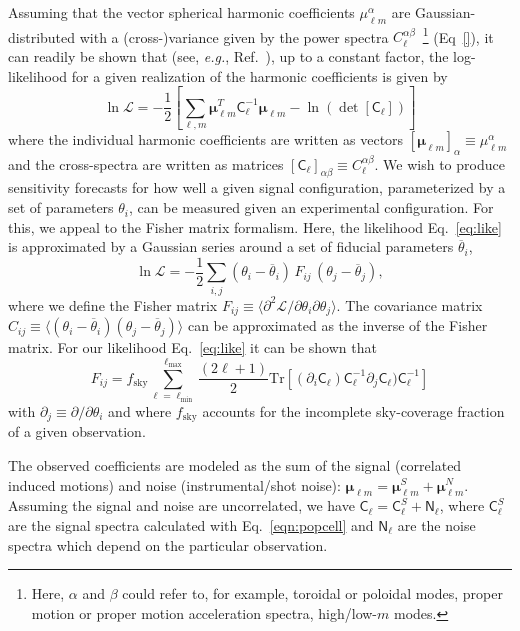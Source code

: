 \documentclass[twocolumn]{aastex63}
\newcommand{\vect}[1]{\boldsymbol{\mathbf{#1}}}
\newcommand{\ellm}{{\ell m}}
\begin{document}
Assuming that the vector spherical harmonic coefficients $\mu_\ellm^{\alpha}$ are Gaussian-distributed with a (cross-)variance given by the power spectra $C_\ell^{\alpha\beta}$~\footnote{Here, $\alpha$ and $\beta$ could refer to, for example, toroidal or poloidal modes, proper motion or proper motion acceleration spectra, high/low-$m$ modes.} (Eq~\ref{}), it can readily be shown that (see, \emph{e.g.}, Ref.~\cite{}), up to a constant factor,  the log-likelihood for a given realization of the harmonic coefficients is given by 
\begin{equation}
\ln \mathcal L = -\frac{1}{2}\left[\sum_{\ell,m}\vect{\mu}_\ellm^T\mathsf C_\ell^{-1}\vect{\mu}_\ellm - \ln(\det[\mathsf C_\ell])\right]
\label{eq:like}
\end{equation}
where the individual harmonic coefficients are written as vectors $[\vect{\mu}_\ellm]_\alpha \equiv \mu_\ellm^\alpha$ and the cross-spectra are written as matrices $[\mathsf C_\ell]_{\alpha\beta}\equiv C_\ell^{\alpha\beta}$. We wish to produce sensitivity forecasts for how well a given signal configuration, parameterized by a set of parameters ${\theta_i}$, can be measured given an experimental configuration. For this, we appeal to the Fisher matrix formalism. Here, the likelihood Eq.~\ref{eq:like} is approximated by a Gaussian series around a set of fiducial parameters ${\overline{\theta}_i}$,
\begin{equation}
\ln \mathcal L = -\frac{1}{2}\sum_{i,j}(\theta_i - \overline{\theta}_i)\,F_{ij}\,(\theta_j - \overline{\theta}_j),
\end{equation}
where we define the Fisher matrix $F_{ij}\equiv\langle\partial^2\mathcal{L}/\partial\theta_i\partial\theta_j\rangle$. The covariance matrix $C_{ij}\equiv \langle(\theta_i - \overline\theta_i)(\theta_j - \overline\theta_j)\rangle$ can be approximated as the inverse of the Fisher matrix. For our likelihood Eq.~\ref{eq:like} it can be shown that
\begin{equation}
F_{ij} = f_\mathrm{sky}\sum_{\ell=\ell_\mathrm{min}}^{\ell_\mathrm{max}}\frac{(2\ell + 1)}{2}\mathrm{Tr}\left[(\partial_i\mathsf C_\ell)\mathsf C_\ell^{-1}\partial_j\mathsf C_\ell)\mathsf C_\ell^{-1}\right]
\label{eq:fisher}
\end{equation}
with $\partial_j\equiv\partial/\partial\theta_i$ and where $f_\mathrm{sky}$ accounts for the incomplete sky-coverage fraction of a given observation.

The observed coefficients are modeled as the sum of the signal (correlated induced motions) and noise (instrumental/shot noise): $\vect{\mu}_\ellm =\vect{\mu}_\ellm^S + \vect{\mu}_\ellm^N$. Assuming the signal and noise are uncorrelated, we have $\mathsf{C}_\ell = \mathsf{C}_\ell^S + \mathsf{N}_\ell$, where $\mathsf{C}_\ell^S$ are the signal spectra calculated with Eq.~\ref{eqn:popcell} and $\mathsf{N}_\ell$ are the noise spectra which depend on the particular observation.
\end{document}
